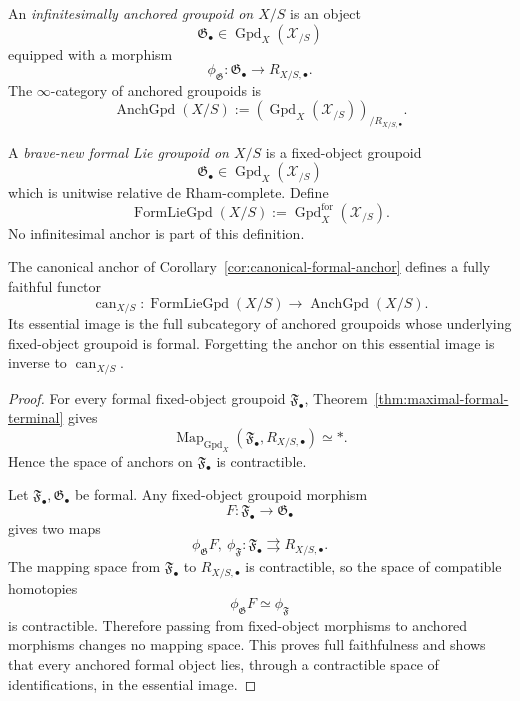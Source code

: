 \begin{definition}
\label{def:infinitesimally-anchored-groupoid}
An \emph{infinitesimally anchored groupoid on $X/S$} is an object
\[
    \mathfrak G_\bullet
    \in
    \operatorname{Gpd}_X(\mathcal X_{/S})
\]
equipped with a morphism
\[
    \phi_{\mathfrak G}:
    \mathfrak G_\bullet
    \longrightarrow
    R_{X/S,\bullet}.
\]
The $\infty$-category of anchored groupoids is
\[
    \operatorname{AnchGpd}(X/S)
    :=
    \left(
        \operatorname{Gpd}_X(\mathcal X_{/S})
    \right)_{/R_{X/S,\bullet}}.
\]
\end{definition}

\begin{definition}
\label{def:formal-lie-groupoid}
A \emph{brave-new formal Lie groupoid on $X/S$} is a fixed-object groupoid
\[
    \mathfrak G_\bullet
    \in
    \operatorname{Gpd}_X(\mathcal X_{/S})
\]
which is unitwise relative de Rham-complete.  Define
\[
    \operatorname{FormLieGpd}(X/S)
    :=
    \operatorname{Gpd}^{\mathrm{for}}_X(\mathcal X_{/S}).
\]
No infinitesimal anchor is part of this definition.
\end{definition}

\begin{theorem}
\label{thm:formal-anchor-forgetful-equivalence}
The canonical anchor of
Corollary~\ref{cor:canonical-formal-anchor} defines a fully faithful functor
\[
    \operatorname{can}_{X/S}:
    \operatorname{FormLieGpd}(X/S)
    \longrightarrow
    \operatorname{AnchGpd}(X/S).
\]
Its essential image is the full subcategory of anchored groupoids whose
underlying fixed-object groupoid is formal.  Forgetting the anchor on this
essential image is inverse to $\operatorname{can}_{X/S}$.
\end{theorem}

\begin{proof}
For every formal fixed-object groupoid $\mathfrak F_\bullet$,
Theorem~\ref{thm:maximal-formal-terminal} gives
\[
    \operatorname{Map}_{\operatorname{Gpd}_X}
    \left(
        \mathfrak F_\bullet,
        R_{X/S,\bullet}
    \right)
    \simeq *.
\]
Hence the space of anchors on $\mathfrak F_\bullet$ is contractible.

Let $\mathfrak F_\bullet,\mathfrak G_\bullet$ be formal.  Any fixed-object
groupoid morphism
\[
    F:\mathfrak F_\bullet\longrightarrow\mathfrak G_\bullet
\]
gives two maps
\[
    \phi_{\mathfrak G}F,\ \phi_{\mathfrak F}:
    \mathfrak F_\bullet\rightrightarrows R_{X/S,\bullet}.
\]
The mapping space from $\mathfrak F_\bullet$ to $R_{X/S,\bullet}$ is
contractible, so the space of compatible homotopies
\[
    \phi_{\mathfrak G}F\simeq\phi_{\mathfrak F}
\]
is contractible.  Therefore passing from fixed-object morphisms to anchored
morphisms changes no mapping space.  This proves full faithfulness and shows
that every anchored formal object lies, through a contractible space of
identifications, in the essential image.
\end{proof}

